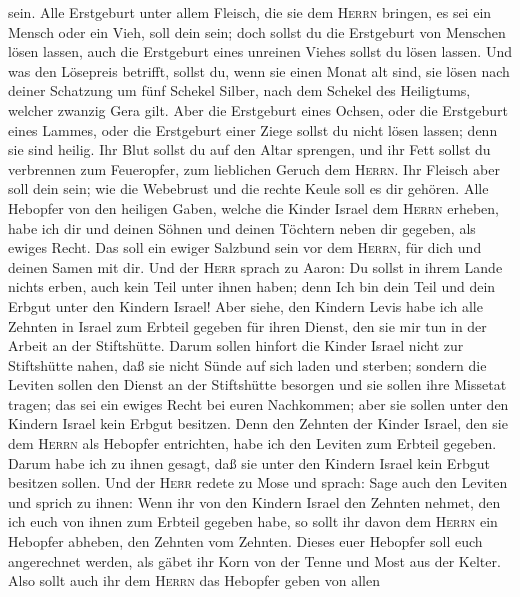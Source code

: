 sein.  Alle Erstgeburt unter allem Fleisch, die sie dem
\textsc{Herrn} bringen, es sei ein Mensch oder ein Vieh, soll dein sein;
doch sollst du die Erstgeburt von Menschen lösen lassen, auch die
Erstgeburt eines unreinen Viehes sollst du lösen lassen. 
Und was den Lösepreis betrifft, sollst du, wenn sie einen Monat alt
sind, sie lösen nach deiner Schatzung um fünf Schekel Silber, nach dem
Schekel des Heiligtums, welcher zwanzig Gera gilt.  Aber
die Erstgeburt eines Ochsen, oder die Erstgeburt eines Lammes, oder die
Erstgeburt einer Ziege sollst du nicht lösen lassen; denn sie sind
heilig. Ihr Blut sollst du auf den Altar sprengen, und ihr Fett sollst
du verbrennen zum Feueropfer, zum lieblichen Geruch dem \textsc{Herrn}.
 Ihr Fleisch aber soll dein sein; wie die Webebrust und
die rechte Keule soll es dir gehören.  Alle Hebopfer von
den heiligen Gaben, welche die Kinder Israel dem \textsc{Herrn} erheben,
habe ich dir und deinen Söhnen und deinen Töchtern neben dir gegeben,
als ewiges Recht. Das soll ein ewiger Salzbund sein vor dem
\textsc{Herrn}, für dich und deinen Samen mit dir.  Und
der \textsc{Herr} sprach zu Aaron: Du sollst in ihrem Lande nichts
erben, auch kein Teil unter ihnen haben; denn Ich bin dein Teil und dein
Erbgut unter den Kindern Israel!  Aber siehe, den Kindern
Levis habe ich alle Zehnten in Israel zum Erbteil gegeben für ihren
Dienst, den sie mir tun in der Arbeit an der Stiftshütte.
 Darum sollen hinfort die Kinder Israel nicht zur
Stiftshütte nahen, daß sie nicht Sünde auf sich laden und sterben;
 sondern die Leviten sollen den Dienst an der Stiftshütte
besorgen und sie sollen ihre Missetat tragen; das sei ein ewiges Recht
bei euren Nachkommen; aber sie sollen unter den Kindern Israel kein
Erbgut besitzen.  Denn den Zehnten der Kinder Israel, den
sie dem \textsc{Herrn} als Hebopfer entrichten, habe ich den Leviten zum
Erbteil gegeben. Darum habe ich zu ihnen gesagt, daß sie unter den
Kindern Israel kein Erbgut besitzen sollen.  Und der
\textsc{Herr} redete zu Mose und sprach:  Sage auch den
Leviten und sprich zu ihnen: Wenn ihr von den Kindern Israel den Zehnten
nehmet, den ich euch von ihnen zum Erbteil gegeben habe, so sollt ihr
davon dem \textsc{Herrn} ein Hebopfer abheben, den Zehnten vom Zehnten.
 Dieses euer Hebopfer soll euch angerechnet werden, als
gäbet ihr Korn von der Tenne und Most aus der Kelter. 
Also sollt auch ihr dem \textsc{Herrn} das Hebopfer geben von allen
